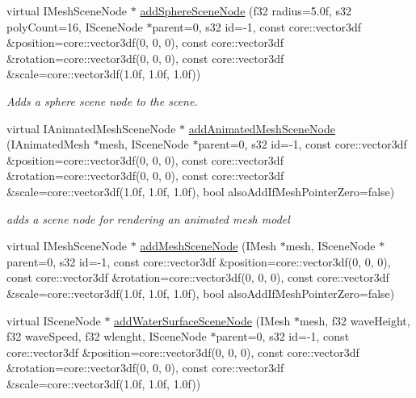 \begin{DoxyCompactItemize}
\item 
virtual I\-Mesh\-Scene\-Node $\ast$ \hyperlink{classirr_1_1scene_1_1_c_scene_manager_a54c023fa51f48e390bc36980f1d61f27}{add\-Sphere\-Scene\-Node} (f32 radius=5.\-0f, s32 poly\-Count=16, I\-Scene\-Node $\ast$parent=0, s32 id=-\/1, const core\-::vector3df \&position=core\-::vector3df(0, 0, 0), const core\-::vector3df \&rotation=core\-::vector3df(0, 0, 0), const core\-::vector3df \&scale=core\-::vector3df(1.\-0f, 1.\-0f, 1.\-0f))
\begin{DoxyCompactList}\small\item\em Adds a sphere scene node to the scene. \end{DoxyCompactList}\item 
\hypertarget{classirr_1_1scene_1_1_c_scene_manager_a58c6dd8b8bf67ccaa4107c1bc695cb91}{virtual I\-Animated\-Mesh\-Scene\-Node $\ast$ \hyperlink{classirr_1_1scene_1_1_c_scene_manager_a58c6dd8b8bf67ccaa4107c1bc695cb91}{add\-Animated\-Mesh\-Scene\-Node} (I\-Animated\-Mesh $\ast$mesh, I\-Scene\-Node $\ast$parent=0, s32 id=-\/1, const core\-::vector3df \&position=core\-::vector3df(0, 0, 0), const core\-::vector3df \&rotation=core\-::vector3df(0, 0, 0), const core\-::vector3df \&scale=core\-::vector3df(1.\-0f, 1.\-0f, 1.\-0f), bool also\-Add\-If\-Mesh\-Pointer\-Zero=false)}\label{classirr_1_1scene_1_1_c_scene_manager_a58c6dd8b8bf67ccaa4107c1bc695cb91}

\begin{DoxyCompactList}\small\item\em adds a scene node for rendering an animated mesh model \end{DoxyCompactList}\item 
virtual I\-Mesh\-Scene\-Node $\ast$ \hyperlink{classirr_1_1scene_1_1_c_scene_manager_a6473a4b8ba6737268c20ba9697e1051e}{add\-Mesh\-Scene\-Node} (I\-Mesh $\ast$mesh, I\-Scene\-Node $\ast$parent=0, s32 id=-\/1, const core\-::vector3df \&position=core\-::vector3df(0, 0, 0), const core\-::vector3df \&rotation=core\-::vector3df(0, 0, 0), const core\-::vector3df \&scale=core\-::vector3df(1.\-0f, 1.\-0f, 1.\-0f), bool also\-Add\-If\-Mesh\-Pointer\-Zero=false)
\item 
\hypertarget{classirr_1_1scene_1_1_c_scene_manager_a59a0344616f452b8e6a521dc539629bd}{virtual I\-Scene\-Node $\ast$ \hyperlink{classirr_1_1scene_1_1_c_scene_manager_a59a0344616f452b8e6a521dc539629bd}{add\-Water\-Surface\-Scene\-Node} (I\-Mesh $\ast$mesh, f32 wave\-Height, f32 wave\-Speed, f32 wlenght, I\-Scene\-Node $\ast$parent=0, s32 id=-\/1, const core\-::vector3df \&position=core\-::vector3df(0, 0, 0), const core\-::vector3df \&rotation=core\-::vector3df(0, 0, 0), const core\-::vector3df \&scale=core\-::vector3df(1.\-0f, 1.\-0f, 1.\-0f))}\label{classirr_1_1scene_1_1_c_scene_manager_a59a0344616f452b8e6a521dc539629bd}


\end{DoxyCompactItemize}
